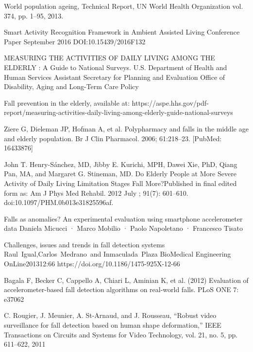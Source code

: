 \documentclass[a4paper, parskip=full]{scrartcl}
\begin{document}
\newpage
\begin{thebibliography}{9}
	

	

World population ageing, Technical Report, UN World Health
Organization vol. 374, pp. 1–95, 2013.



Smart Activity	Recognition	Framework in Ambient Assisted Living
Conference	Paper September	2016
DOI:10.15439/2016F132


MEASURING THE ACTIVITIES OF DAILY LIVING AMONG THE ELDERLY : A Guide to National Surveys. U.S. Department of Health and Human Services Assistant Secretary for Planning and Evaluation Office of Disability, Aging and Long-Term Care Policy


Fall prevention in the elderly, available at: https://aspe.hhs.gov/pdf-report/measuring-activities-daily-living-among-elderly-guide-national-surveys

Ziere G, Dieleman JP, Hofman A, et al. Polypharmacy and falls in the middle age and elderly
population. Br J Clin Pharmacol. 2006; 61:218–23. [PubMed: 16433876]

John T. Henry-Sánchez, MD, Jibby E. Kurichi, MPH, Dawei Xie, PhD, Qiang Pan, MA, and
Margaret G. Stineman, MD. Do Elderly People at More Severe Activity of Daily Living Limitation Stages Fall More?Published in final edited form as: Am J Phys Med Rehabil. 2012 July ; 91(7): 601–610. doi:10.1097/PHM.0b013e31825596af.


Falls as anomalies? An experimental evaluation using smartphone accelerometer data Daniela Micucci · Marco Mobilio · Paolo Napoletano · Francesco Tisato



Challenges, issues and trends in fall detection systems Raul Igual,Carlos Medrano and
Inmaculada Plaza BioMedical Engineering OnLine201312:66
https://doi.org/10.1186/1475-925X-12-66

Bagala F, Becker C, Cappello A, Chiari L, Aminian K, et al. (2012) Evaluation of accelerometer-based fall detection algorithms on real-world falls. PLoS ONE 7: e37062

C. Rougier, J. Meunier, A. St-Arnaud, and J. Rousseau, “Robust video surveillance for fall detection based on human shape deformation,” IEEE Transactions on Circuits and Systems for Video Technology, vol. 21, no. 5, pp. 611–622, 2011


\end{thebibliography}
\end{document}

